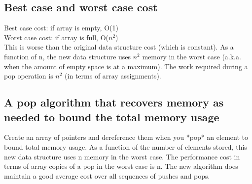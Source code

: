 \documentclass{article}
\begin{document}
\subsection{Best case and worst case cost}
Best case cost: if array is empty, O(1)\\
Worst case cost: if array is full, O($n^2$)\\
This is worse than the original data structure cost (which is constant). As a function of n, the new data structure uses $n^2$ memory in the worst case (a.k.a. when the amount of empty space is at a maximum). The work required during a pop operation is $n^2$ (in terms of
array assignments). \\

\subsection{A pop algorithm that recovers memory as needed to bound the total memory usage}

Create an array of pointers and dereference them when you *pop* an element to bound total memory usage. As a function of the number of elements stored, this new data structure uses n memory in the worst case. The performance cost in terms of array copies of a pop in the worst case is n. The new algorithm does maintain a good average cost over all sequences of pushes and pops. 
\end{document}
